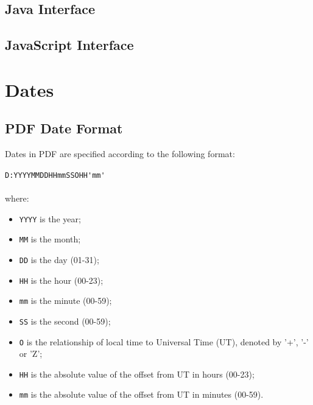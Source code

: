 \documentclass{book}
\begin{document}
\begin{jcpdflib}
\clearpage
\section*{Java Interface}
\begin{small}\tt

\end{small}
\end{jcpdflib}

\begin{jscpdflib}
\clearpage
\section*{JavaScript Interface}
\begin{small}\tt

\end{small}
\end{jscpdflib}

\appendix
\chapter{Dates}\pagestyle{empty}
\label{dates}

\section{PDF Date Format}
Dates in PDF are specified according to the following format:

\begin{framed}
\verb!D:YYYYMMDDHHmmSSOHH'mm'!\\\\where:

\begin{itemize}
  \item \texttt{YYYY} is the year;
  \item \texttt{MM} is the month;
  \item \texttt{DD} is the day (01-31);
  \item \texttt{HH} is the hour (00-23);
  \item \texttt{mm} is the minute (00-59);
  \item \texttt{SS} is the second (00-59);
  \item \texttt{O} is the relationship of local time to Universal Time (UT), denoted by '+', '-' or 'Z';
  \item \texttt{HH} is the absolute value of the offset from UT in hours (00-23);
  \item \texttt{mm} is the absolute value of the offset from UT in minutes (00-59).
\end{itemize}
\end{framed}
\end{document}
